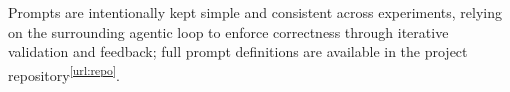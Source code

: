 \documentclass[runningheads]{llncs}
\begin{document}
Prompts are intentionally kept simple and consistent across experiments,
relying on the surrounding agentic loop to enforce correctness through iterative validation and feedback; full prompt definitions are available in the project repository\textsuperscript{\ref{url:repo}}.



\end{document}
